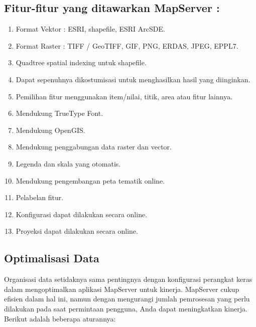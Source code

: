 \subsection{Fitur-fitur yang ditawarkan MapServer :}
 \begin{enumerate}
\item Format Vektor : ESRI, shapefile, ESRI ArcSDE.
\item Format Raster : TIFF / GeoTIFF, GIF, PNG, ERDAS, JPEG, EPPL7.
\item Quadtree spatial indexing untuk shapefile.
\item Dapat sepenuhnya dikostumisasi untuk menghasilkan hasil yang diinginkan.
\item Pemilihan fitur menggunakan item/nilai, titik, area atau fitur lainnya.
\item Mendukung TrueType Font.
\item Mendukung OpenGIS.
\item Mendukung penggabungan data raster dan vector.
\item Legenda dan skala yang otomatis.
\item Mendukung pengembangan peta tematik online.
\item Pelabelan fitur.
\item Konfigurasi dapat dilakukan secara online.
\item Proyeksi dapat dilakukan secara online.
\end{enumerate}

\subsection{Optimalisasi Data}
Organisasi data setidaknya sama pentingnya dengan konfigurasi perangkat keras dalam mengoptimalkan aplikasi MapServer untuk kinerja. MapServer cukup efisien dalam hal ini, namun dengan mengurangi jumlah pemrosesan yang perlu dilakukan pada saat permintaan pengguna, Anda dapat meningkatkan kinerja. Berikut adalah beberapa aturannya:
